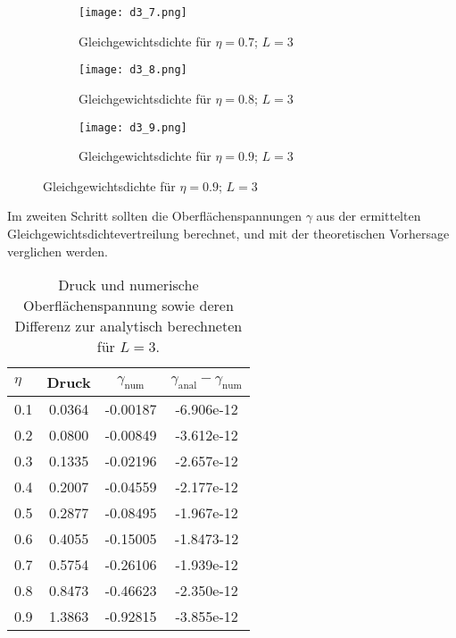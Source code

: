 \documentclass[12pt]{article}
\begin{document}
\begin{figure}[H]\hspace*{-1.5cm}
\begin{subfigure}{0.4\textwidth}
\texttt{[image: d3\_7.png]}
\caption{Gleichgewichtsdichte\newline
für $\eta=0.7$; $L=3$}
\end{subfigure}
\hfill
\begin{subfigure}{0.4\textwidth}
\hspace*{-0.8cm}
\texttt{[image: d3\_8.png]}
\caption{Gleichgewichtsdichte\newline
für $\eta=0.8$; $L=3$}
\end{subfigure}
\hfill
\hspace*{-1.5cm}
\begin{subfigure}{0.4\textwidth}
\texttt{[image: d3\_9.png]}
\caption{Gleichgewichtsdichte\newline
für $\eta=0.9$; $L=3$}
\end{subfigure}
\hfill
\end{figure}

Im zweiten Schritt sollten die Oberflächenspannungen $\gamma$ aus der ermittelten Gleichgewichtsdichtevertreilung berechnet, und mit der theoretischen Vorhersage verglichen werden.

\begin{table}[H]\centering\begin{tabular}{l | c | c | c}
$\eta$&Druck&$\gamma_\text{num}$&$\gamma_\text{anal}-\gamma_\text{num}$\\\hline\hline
0.1&0.0364&-0.00187&-6.906e-12\\
0.2&0.0800&-0.00849&-3.612e-12\\
0.3&0.1335&-0.02196&-2.657e-12\\
0.4&0.2007&-0.04559&-2.177e-12\\
0.5&0.2877&-0.08495&-1.967e-12\\
0.6&0.4055&-0.15005&-1.8473-12\\
0.7&0.5754&-0.26106&-1.939e-12\\
0.8&0.8473&-0.46623&-2.350e-12\\
0.9&1.3863&-0.92815&-3.855e-12
\end{tabular}\caption{Druck und numerische Oberflächenspannung sowie deren Differenz zur analytisch berechneten für $L=3$.}\end{table}
\end{document}
